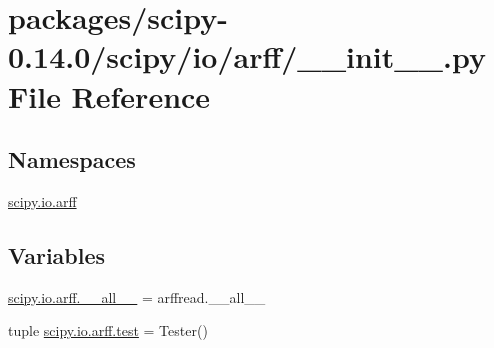 \hypertarget{packages_2scipy-0_814_80_2scipy_2io_2arff_2____init_____8py}{}\section{packages/scipy-\/0.14.0/scipy/io/arff/\+\_\+\+\_\+init\+\_\+\+\_\+.py File Reference}
\label{packages_2scipy-0_814_80_2scipy_2io_2arff_2____init_____8py}
\subsection*{Namespaces}
\begin{DoxyCompactItemize}
\item 
 \hyperlink{namespacescipy_1_1io_1_1arff}{scipy.\+io.\+arff}
\end{DoxyCompactItemize}
\subsection*{Variables}
\begin{DoxyCompactItemize}
\item 
\hyperlink{namespacescipy_1_1io_1_1arff_a12e41f7d3b05e6f24ed3ea53adef2af7}{scipy.\+io.\+arff.\+\_\+\+\_\+all\+\_\+\+\_\+} = arffread.\+\_\+\+\_\+all\+\_\+\+\_\+
\item 
tuple \hyperlink{namespacescipy_1_1io_1_1arff_ac902c6dc61d43824db7dda4e6a6305ee}{scipy.\+io.\+arff.\+test} = Tester()
\end{DoxyCompactItemize}
